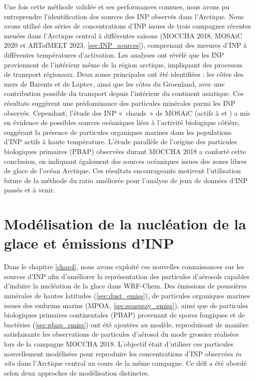 Une fois cette méthode validée et ses performances connues, nous avons pu entreprendre l’identification des sources des INP observés dans l’Arctique.  
Nous avons utilisé des séries de concentrations d’INP issues de trois campagnes récentes menées dans l’Arctique central à différentes saisons (MOCCHA 2018, MOSAiC 2020 et ARTofMELT 2023, \cref{sec:INP_sources}), comprenant des mesures d'INP à différentes températures d’activation.  
Les analyses ont révélé que les INP proviennent de l’intérieur même de la région arctique, impliquant des processus de transport régionaux.  
Deux zones principales ont été identifiées : les côtes des mers de Barents et de Laptev, ainsi que les côtes du Groenland, avec une contribution possible du transport depuis l’intérieur du continent asiatique.  
Ces résultats suggèrent une prédominance des particules minérales parmi les INP observés. Cependant, l’étude des INP «~chauds~» de MOSAiC (actifs à  et ) a mis en évidence de possibles sources océaniques liées à l’activité biologique côtière, suggérant la présence de particules organiques marines dans les populations d’INP actifs à haute température.  
L’étude parallèle de l’origine des particules biologiques primaires (PBAP) observées durant MOCCHA 2018 a conforté cette conclusion, en indiquant également des sources océaniques issues des zones libres de glace de l’océan Arctique.  
Ces résultats encourageants motivent l’utilisation future de la méthode du ratio améliorée pour l’analyse de jeux de données d’INP passés et à venir.  


\section*{Modélisation de la nucléation de la glace et émissions d’INP}
Dans le chapitre \ref{chap4}, nous avons exploité ces nouvelles connaissances sur les sources d’INP afin d’améliorer la représentation des particules d’aérosols capables d’induire la nucléation de la glace dans WRF-Chem.  
Des émissions de poussières minérales de hautes latitudes (\cref{sec:dust_emiss}), de particules organiques marines issues des embruns marins (MPOA, \cref{sec:seaspray_emiss}), ainsi que de particules biologiques primaires continentales (PBAP) provenant de spores fongiques et de bactéries (\cref{sec:pbap_emiss}) ont été ajoutées au modèle, reproduisant de manière satisfaisante les observations de particules d'aérosol du mode grossier réalisées lors de la campagne MOCCHA 2018.  
L’objectif était d’utiliser ces particules nouvellement modélisées pour reproduire les concentrations d’INP observées \textit{in situ} dans l’Arctique central au cours de la même campagne.  
Ce défi a été abordé selon deux approches de modélisation distinctes.

